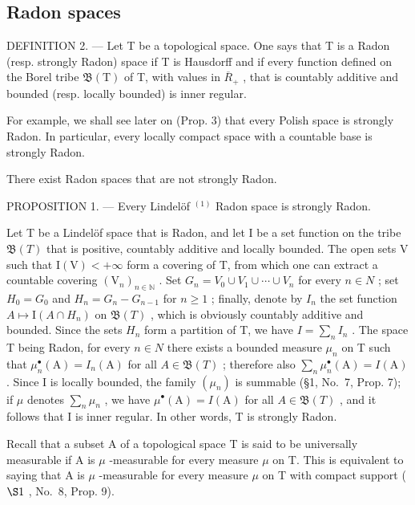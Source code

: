 \subsection{Radon spaces}

DEFINITION 2. --- Let T be a topological space. One says that T is a Radon (resp. strongly Radon) space if T is Hausdorff and if every function defined on the Borel tribe \(\mathfrak{B}(\mathrm{T})\) of T, with values in \(\overline{R}_{+}\) , that is countably additive and bounded (resp. locally bounded) is inner regular.

For example, we shall see later on (Prop. 3) that every Polish space is strongly Radon. In particular, every locally compact space with a countable base is strongly Radon.

There exist Radon spaces that are not strongly Radon.

PROPOSITION 1. --- Every Lindelöf \(^{(1)}\) Radon space is strongly Radon.

Let T be a Lindelöf space that is Radon, and let I be a set function on the tribe \(\mathfrak{B}(T)\) that is positive, countably additive and locally bounded. The open sets V such that \(\mathrm{I}(\mathrm{V}) < +\infty\) form a covering of T, from which one can extract a countable covering \((\mathrm{V}_{n})_{n \in \mathbb{N}}\) . Set \(G_{n} = V_{0} \cup V_{1} \cup \cdots \cup V_{n}\) for every \(n \in N\) ; set \(H_{0} = G_{0}\) and \(H_{n} = G_{n} - G_{n-1}\) for \(n \geqslant 1\) ; finally, denote by \(I_{n}\) the set function \(A \mapsto \mathrm{I}(A \cap H_{n})\) on \(\mathfrak{B}(T)\) , which is obviously countably additive and bounded. Since the sets \(H_{n}\) form a partition of T, we have \(I = \sum_{n} I_{n}\) . The space T being Radon, for every \(n \in N\) there exists a bounded measure \(\mu_{n}\) on T such that \(\mu_{n}^{\bullet}(\mathrm{A}) = I_{n}(\mathrm{A})\) for all \(A \in \mathfrak{B}(T)\) ; therefore also \(\sum_{n} \mu_{n}^{\bullet}(\mathrm{A}) = I(\mathrm{A})\) . Since I is locally bounded, the family \((\mu_{n})\) is summable (§1, No.~7, Prop. 7); if \(\mu\) denotes \(\sum_{n} \mu_{n}\) , we have \(\mu^{\bullet}(\mathrm{A}) = I(\mathrm{A})\) for all \(A \in \mathfrak{B}(T)\) , and it follows that I is inner regular. In other words, T is strongly Radon.

Recall that a subset A of a topological space T is said to be universally measurable if A is \(\mu\) -measurable for every measure \(\mu\) on T. This is equivalent to saying that A is \(\mu\) -measurable for every measure \(\mu\) on T with compact support ( \(\S1\) , No.~8, Prop. 9).

